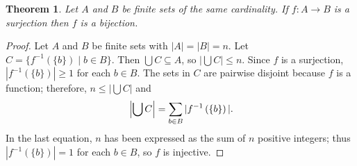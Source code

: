 \documentclass[12pt]{article}
\begin{document}
\newtheorem*{theorem}{Theorem}

\begin{theorem}
Let $A$ and $B$ be finite sets of the same cardinality. If $f\colon
A \to B$ is a surjection then $f$ is a bijection.
\end{theorem}
\begin{proof}
Let $A$ and $B$ be finite sets with $|A| = |B| = n$. Let $C
=\{f^{-1}\left(\{b\}\right)\mid b \in B \}$. Then $\bigcup C
\subseteq A$, so $|\bigcup C| \le n$. Since $f$ is a surjection,
$|f^{-1}\left(\{b\}\right)| \ge 1$ for each $b \in B$. The sets in
$C$ are pairwise disjoint because $f$ is a function; therefore, $n
\le |\bigcup C|$ and \begin{equation*} \\
\left|\bigcup C \right|=\sum_{b\in B}|f^{-1}\left(\{b\}\right)|
.\end{equation*}  In the last equation, $n$ has been expressed as
the sum of $n$ positive integers; thus $|f^{-1}\left(\{b\}\right)|
= 1$ for each $b \in B$, so $f$ is injective.
\end{proof}
\end{document}
